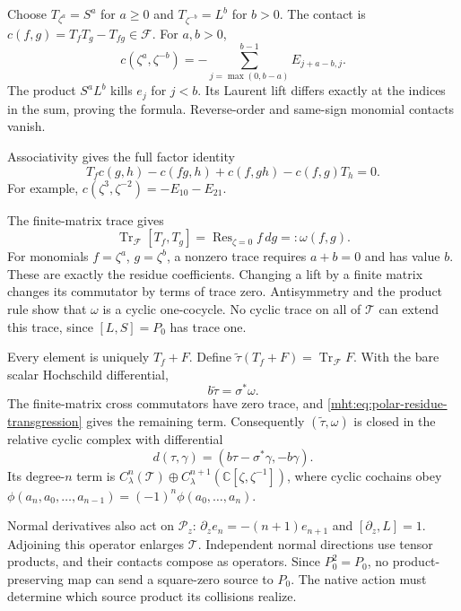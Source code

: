 Choose $T_{\zeta^a}=S^a$ for $a\geq0$ and
$T_{\zeta^{-b}}=L^b$ for $b>0$. The contact is
$c(f,g)=T_fT_g-T_{fg}\in\mathcal F$.
For $a,b>0$,
\begin{equation}\label{mht:eq:polar-section-contact}
 c(\zeta^a,\zeta^{-b})
   =-\sum_{j=\max(0,b-a)}^{b-1}E_{j+a-b,j}.
\end{equation}
The product $S^aL^b$ kills $e_j$ for $j<b$.
Its Laurent lift differs exactly at the indices in the
sum, proving the formula. Reverse-order and same-sign
monomial contacts vanish.

Associativity gives the full
factor identity
\[
 T_fc(g,h)-c(fg,h)+c(f,gh)-c(f,g)T_h=0.
\]
For example, $c(\zeta^3,\zeta^{-2})=-E_{10}-E_{21}$.

The finite-matrix trace gives
\begin{equation}\label{mht:eq:polar-residue-transgression}
 \operatorname{Tr}_{\mathcal F}[T_f,T_g]
       =\operatorname{Res}_{\zeta=0}f\,dg=:\omega(f,g).
\end{equation}
For monomials $f=\zeta^a$, $g=\zeta^b$, a nonzero
trace requires $a+b=0$ and has value $b$.
These are exactly the residue coefficients.
Changing a lift by a finite matrix changes its commutator
by terms of trace zero. Antisymmetry and the product
rule show that $\omega$ is a cyclic one-cocycle.
No cyclic trace on all of $\mathcal T$ can extend this
trace, since $[L,S]=P_0$ has trace one.

Every element is uniquely $T_f+F$. Define
$\widetilde\tau(T_f+F)=\operatorname{Tr}_{\mathcal F}F$.
With the bare scalar Hochschild differential,
\[
 b\widetilde\tau=\sigma^*\omega.
\]
The finite-matrix cross commutators have zero trace,
and \eqref{mht:eq:polar-residue-transgression} gives the
remaining term. Consequently $(\widetilde\tau,\omega)$
is closed in the relative cyclic complex with differential
\[
 d(\tau,\gamma)=(b\tau-\sigma^*\gamma,-b\gamma).
\]
Its degree-$n$ term is
$C^n_\lambda(\mathcal T)\oplus C^{n+1}_\lambda
(\mathbb C[\zeta,\zeta^{-1}])$, where cyclic cochains
obey $\phi(a_n,a_0,\ldots,a_{n-1})=(-1)^n\phi(a_0,\ldots,a_n)$.

Normal derivatives also act on $\mathcal P_z$:
$\partial_z e_n=-(n+1)e_{n+1}$ and $[\partial_z,L]=1$.
Adjoining this operator enlarges $\mathcal T$.
Independent normal directions use tensor products, and
their contacts compose as operators. Since $P_0^2=P_0$,
no product-preserving map can send a square-zero source
to $P_0$. The native action must determine which source
product its collisions realize.

